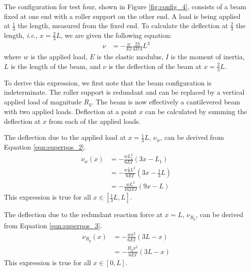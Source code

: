 \documentclass[12 pt]{article}
\newcommand{\ie}{\textit{i}.\textit{e}., }
\begin{document}
The configuration for test four, shown in Figure \ref{fig:config_4}, consists of a beam fixed at one end with a roller support on the other end. A load is being applied at $\frac{1}{3}$ the length, measured from the fixed end. To calculate the deflection at $\frac{2}{3}$ the length, \ie $x=\frac{2}{3}L$, we are given the following equation:
\begin{align} \label{eqn:config_4-deflection}
	\nu&=-\frac{w}{EI}\frac{23}{4374}L^3
\end{align}
where $w$ is the applied load, $E$ is the elastic modulus, $I$ is the moment of inertia, $L$ is the length of the beam, and $\nu$ is the deflection of the beam at $x=\frac{2}{3}L$.

To derive this expression, we first note that the beam configuration is indeterminate. The roller support is redundant and can be replaced by a vertical applied load of magnitude $R_y$. The beam is now effectively a cantilevered beam with two applied loads. Deflection at a point $x$ can be calculated by summing the deflection at $x$ from each of the applied loads.

The deflection due to the applied load at $x=\frac{1}{3}L$, $\nu_w$, can be derived from Equation \ref{eqn:superpos_2}.
\begin{align*}
	\nu_w(x)&=-\frac{wL_1^2}{6EI}(3x-L_1)\\
	&=-\frac{w\frac{1}{9}L^2}{6EI}(3x-\frac{1}{3}L)\\
	&=-\frac{wL^2}{162EI}(9x-L)
\end{align*}
This expression is true for all $x\in[\frac{1}{3}L,L]$.

The deflection due to the redundant reaction force at $x=L$, $\nu_{R_y}$, can be derived from Equation \ref{eqn:superpos_3}.
\begin{align*}
	\nu_{R_y}(x)&=-\frac{wx^2}{6EI}(3L-x)\\
	&=-\frac{R_yx^2}{6EI}(3L-x)
\end{align*}
This expression is true for all $x\in[0,L]$.
\end{document}
